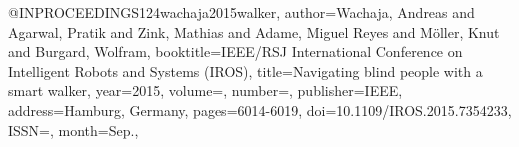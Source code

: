 @INPROCEEDINGS{124wachaja2015walker,
author={Wachaja, Andreas and Agarwal, Pratik and Zink, Mathias and Adame, Miguel Reyes and Möller, Knut and Burgard, Wolfram},
booktitle={IEEE/RSJ International Conference on Intelligent Robots and Systems (IROS)}, 
title={Navigating blind people with a smart walker}, 
year={2015},
volume={},
number={},
publisher={IEEE},
address={Hamburg, Germany},
pages={6014-6019},
doi={10.1109/IROS.2015.7354233},
ISSN={},
month={Sep.},}
